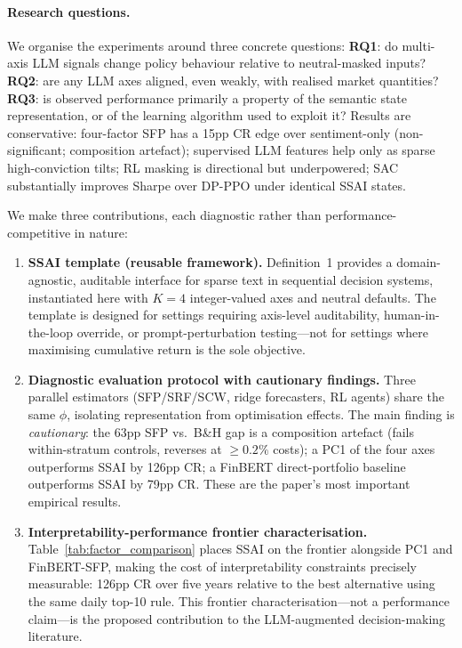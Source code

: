 \documentclass{article}
\begin{document}
\paragraph{Research questions.}
We organise the experiments around three concrete questions:
\textbf{RQ1}: do multi-axis LLM signals change policy behaviour relative to neutral-masked inputs?
\textbf{RQ2}: are any LLM axes aligned, even weakly, with realised market quantities?
\textbf{RQ3}: is observed performance primarily a property of the semantic state representation, or of the learning algorithm used to exploit it?
Results are conservative: four-factor SFP has a 15pp CR edge over sentiment-only (non-significant; composition artefact); supervised LLM features help only as sparse high-conviction tilts; RL masking is directional but underpowered; SAC substantially improves Sharpe over DP-PPO under identical SSAI states.

We make three contributions, each diagnostic rather than performance-competitive in nature:
\begin{enumerate}
  \item \textbf{SSAI template (reusable framework).}
    Definition~1 provides a domain-agnostic, auditable interface for sparse text in sequential decision systems, instantiated here with $K{=}4$ integer-valued axes and neutral defaults.
    The template is designed for settings requiring axis-level auditability, human-in-the-loop override, or prompt-perturbation testing---not for settings where maximising cumulative return is the sole objective.

  \item \textbf{Diagnostic evaluation protocol with cautionary findings.}
    Three parallel estimators (SFP/SRF/SCW, ridge forecasters, RL agents) share the same $\phi$, isolating representation from optimisation effects.
    The main finding is \emph{cautionary}: the 63pp SFP vs.\ B\&H gap is a composition artefact (fails within-stratum controls, reverses at ${\geq}0.2\%$ costs); a PC1 of the four axes outperforms SSAI by 126pp CR; a FinBERT direct-portfolio baseline outperforms SSAI by 79pp CR.
    These are the paper's most important empirical results.

  \item \textbf{Interpretability-performance frontier characterisation.}
    Table~\ref{tab:factor_comparison} places SSAI on the frontier alongside PC1 and FinBERT-SFP, making the cost of interpretability constraints precisely measurable: 126pp CR over five years relative to the best alternative using the same daily top-10 rule.
    This frontier characterisation---not a performance claim---is the proposed contribution to the LLM-augmented decision-making literature.
\end{enumerate}
\end{document}
